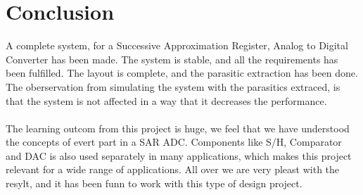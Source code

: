 \documentclass[english, 12pt, a4paper]{ifimaster}
\begin{document}
\chapter{Conclusion}
A complete system, for a Successive Approximation Register, Analog to Digital Converter has been 
made. The system is stable, and all the requirements has been fulfilled. The layout is complete, 
and the parasitic extraction has been done. The oberservation from simulating the system with the
parasitics extraced, is that the system is not affected in a way that it decreases the performance.\\
\\
The learning outcom from this project is huge, we feel that we have understood the concepts
of evert part in a SAR ADC. Components like S/H, Comparator and DAC is also used separately in many
applications, which makes this project relevant for a wide range of applications. All over we 
are very pleast with the resylt, and it has been funn to work with this type of design project. 
\end{document}
